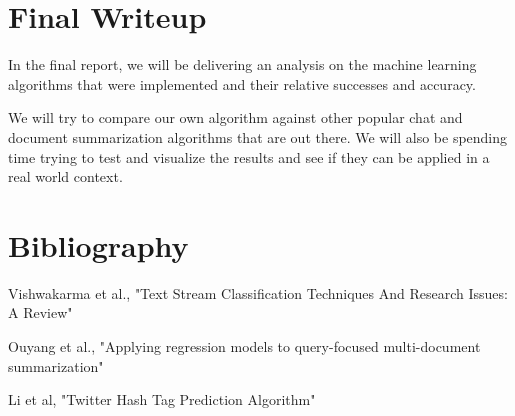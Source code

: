 \documentclass[11pt]{article}
\begin{document}
\section{Final Writeup}
In the final report, we will be delivering an analysis on the machine learning algorithms that were implemented and their relative successes and accuracy.

We will try to compare our own algorithm against other popular chat and document summarization algorithms that are out there. We will also be spending time trying to test and visualize the results and see if they can be applied in a real world context.


\section{Bibliography}
Vishwakarma et al., "Text Stream Classification Techniques And Research Issues: A Review"

Ouyang et al., "Applying regression models to query-focused multi-document summarization"

Li et al, "Twitter Hash Tag Prediction Algorithm"
\end{document}

